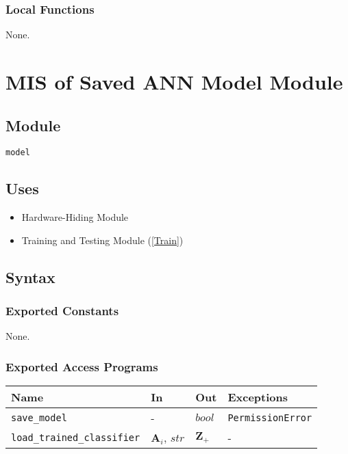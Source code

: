 \documentclass[12pt, titlepage]{article}
\def\code#1{\texttt{#1}}
\begin{document}

\subsubsection{Local Functions}
None.


\newpage

\section{MIS of Saved ANN Model Module} \label{SavedANN} 

\subsection{Module}
\code{model} 

\subsection{Uses}
\begin{itemize}
  \item Hardware-Hiding Module  
  \item Training and Testing Module (\ref{Train})
\end{itemize}


\subsection{Syntax}

\subsubsection{Exported Constants}
None.

\subsubsection{Exported Access Programs}

\begin{center}
\begin{tabular}{p{5cm} p{4cm} p{4cm} p{3.5cm}}
\hline
\textbf{Name} & \textbf{In} & \textbf{Out} & \textbf{Exceptions} \\
\hline
\code{save\_model} & - & $bool$ & \code{PermissionError} \\
\code{load\_trained\_classifier} & $\mathbf{A}_{i}$, $str$ & $\mathbf{Z}_{+}$ & - \\
\hline
\end{tabular}
\end{center}
\end{document}
